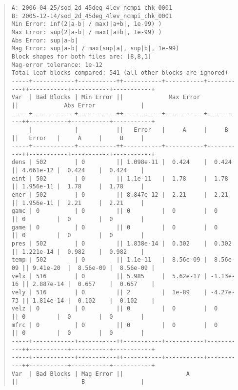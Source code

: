 \begin{quote}
\begin{tiny}
\begin{samepage}
\begin{verbatim}
A: 2006-04-25/sod_2d_45deg_4lev_ncmpi_chk_0001
B: 2005-12-14/sod_2d_45deg_4lev_ncmpi_chk_0001
Min Error: inf(2|a-b| / max(|a+b|, 1e-99) )
Max Error: sup(2|a-b| / max(|a+b|, 1e-99) )
Abs Error: sup|a-b|
Mag Error: sup|a-b| / max(sup|a|, sup|b|, 1e-99)
Block shapes for both files are: [8,8,1]
Mag-error tolerance: 1e-12
Total leaf blocks compared: 541 (all other blocks are ignored)
-----+------------+-----------++-----------+-----------+-----------++-----------+-----------+-----------+
Var  | Bad Blocks | Min Error ||             Max Error             ||             Abs Error             |
-----+------------+-----------++-----------+-----------+-----------++-----------+-----------+-----------+
     |            |           ||   Error   |     A     |     B     ||   Error   |     A     |     B     |
-----+------------+-----------++-----------+-----------+-----------++-----------+-----------+-----------+
dens | 502        | 0         || 1.098e-11 |  0.424    |  0.424    || 4.661e-12 |  0.424    |  0.424    |
eint | 502        | 0         || 1.1e-11   |  1.78     |  1.78     || 1.956e-11 |  1.78     |  1.78     |
ener | 502        | 0         || 8.847e-12 |  2.21     |  2.21     || 1.956e-11 |  2.21     |  2.21     |
gamc | 0          | 0         || 0         |  0        |  0        || 0         |  0        |  0        |
game | 0          | 0         || 0         |  0        |  0        || 0         |  0        |  0        |
pres | 502        | 0         || 1.838e-14 |  0.302    |  0.302    || 1.221e-14 |  0.982    |  0.982    |
temp | 502        | 0         || 1.1e-11   |  8.56e-09 |  8.56e-09 || 9.41e-20  |  8.56e-09 |  8.56e-09 |
velx | 516        | 0         || 5.985     |  5.62e-17 | -1.13e-16 || 2.887e-14 |  0.657    |  0.657    |
vely | 516        | 0         || 2         |  1e-89    | -4.27e-73 || 1.814e-14 |  0.102    |  0.102    |
velz | 0          | 0         || 0         |  0        |  0        || 0         |  0        |  0        |
mfrc | 0          | 0         || 0         |  0        |  0        || 0         |  0        |  0        |
-----+------------+-----------++-----------+-----------+-----------++-----------+-----------+-----------+
-----+------------+-----------++-----------+-----------+-----------++-----------+-----------+-----------+
Var  | Bad Blocks | Mag Error ||                  A                ||                  B                |

\end{verbatim}
\end{samepage}
\end{tiny}
\end{quote}
